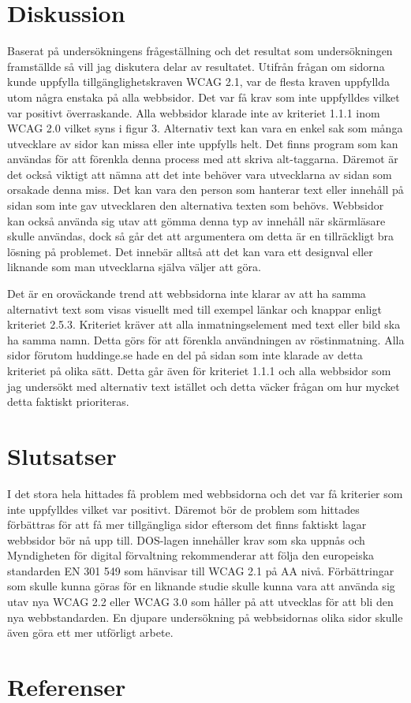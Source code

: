 \documentclass[11p]{article}
\begin{document}
    \section{Diskussion}
    Baserat på undersökningens frågeställning och det resultat som undersökningen framställde så vill jag diskutera delar av resultatet.
    Utifrån frågan om sidorna kunde uppfylla tillgänglighetskraven WCAG 2.1, var de flesta kraven uppfyllda utom några enstaka på alla webbsidor.
    Det var få krav som inte uppfylldes vilket var positivt överraskande.
    Alla webbsidor klarade inte av kriteriet 1.1.1 inom WCAG 2.0 vilket syns i figur 3.
    Alternativ text kan vara en enkel sak som många utvecklare av sidor kan missa eller inte uppfylls helt.
    Det finns program som kan användas för att förenkla denna process med att skriva alt-taggarna.
    Däremot är det också viktigt att nämna att det inte behöver vara utvecklarna av sidan som orsakade denna miss.
    Det kan vara den person som hanterar text eller innehåll på sidan som inte gav utvecklaren den alternativa texten som behövs.
    Webbsidor kan också använda sig utav att gömma denna typ av innehåll när skärmläsare skulle användas, dock så går det att argumentera om detta är en tillräckligt bra lösning på problemet.
    Det innebär alltså att det kan vara ett designval eller liknande som man utvecklarna själva väljer att göra.

    Det är en oroväckande trend att webbsidorna inte klarar av att ha samma alternativt text som visas visuellt med till exempel länkar och knappar enligt kriteriet 2.5.3.
    Kriteriet kräver att alla inmatningselement med text eller bild ska ha samma namn.
    Detta görs för att förenkla användningen av röstinmatning.
    Alla sidor förutom huddinge.se hade en del på sidan som inte klarade av detta kriteriet på olika sätt.
    Detta går även för kriteriet 1.1.1 och alla webbsidor som jag undersökt med alternativ text istället och detta väcker frågan om hur mycket detta faktiskt prioriteras.
    
    \section{Slutsatser}
    I det stora hela hittades få problem med webbsidorna och det var få kriterier som inte uppfylldes vilket var positivt.
    Däremot bör de problem som hittades förbättras för att få mer tillgängliga sidor eftersom det finns faktiskt lagar webbsidor bör nå upp till.
    DOS-lagen innehåller krav som ska uppnås och Myndigheten för digital förvaltning rekommenderar att följa den europeiska standarden EN 301 549 som hänvisar till WCAG 2.1 på AA nivå.
    Förbättringar som skulle kunna göras för en liknande studie skulle kunna vara att använda sig utav nya WCAG 2.2 eller WCAG 3.0 som håller på att utvecklas för att bli den nya webbstandarden.
    En djupare undersökning på webbsidornas olika sidor skulle även göra ett mer utförligt arbete.

    \section{Referenser}
    \printbibliography[heading=none]
\end{document}
